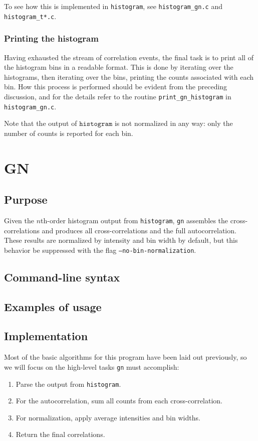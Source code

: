\documentclass{article}
\newcommand{\histogram}{\texttt{histogram}}
\newcommand{\GN}{\texttt{gn}}
\begin{document}
To see how this is implemented in \histogram, see \texttt{histogram\_gn.c} and \texttt{histogram\_t*.c}. 

\subsubsection{Printing the histogram}
Having exhausted the stream of correlation events, the final task is to print all of the histogram bins in a readable format. This is done by iterating over the histograms, then iterating over the bins, printing the counts associated with each bin. How this process is performed should be evident from the preceding discussion, and for the details refer to the routine \texttt{print\_gn\_histogram} in \texttt{histogram\_gn.c}.

Note that the output of $\histogram$ is not normalized in any way: only the number of counts is reported for each bin.

\section{GN}
\subsection{Purpose}
Given the $n$th-order histogram output from \histogram, \GN{} assembles the cross-correlations and produces all cross-correlations and the full autocorrelation. These results are normalized by intensity and bin width by default, but this behavior be suppressed with the flag \texttt{--no-bin-normalization}.

\subsection{Command-line syntax}

\subsection{Examples of usage}

\subsection{Implementation}
Most of the basic algorithms for this program have been laid out previously, so we will focus on the high-level tasks \GN{} must accomplish:
\begin{enumerate}
\item Parse the output from \histogram.
\item For the autocorrelation, sum all counts from each cross-correlation.
\item For normalization, apply average intensities and bin widths.
\item Return the final correlations.
\end{enumerate}
\end{document}
